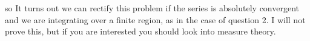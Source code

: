 \documentclass{article}
\begin{document}
so 
It turns out we can rectify this problem if the series is absolutely convergent and we are integrating over a finite region, as in the case of question 2. I will not prove this, but if you are interested you should look into measure theory. 
\begin{comment}
\subsection{Swapping sums and integrals - an example}
Let me define a function $a$ by 
\eq{
a(t) = \left\lbrace \begin{array}{cc}
\sin(\pi t) & 0 \leq t \leq 1 \\
0 & \text{otherwise}
\end{array} \right.
}
$a(t)$ looks like half a single period of a sin function in the interval $[0,1]$. Now let me define $a_n(t)$ by 
\eq{
a_n(t) = b_n a(t-n) - b_{n+1} a(t-n-1)
}
where $b_n$ is some other real sequence. The $a_n$ for $b_n = \frac{1}{n}$ are displayed below. 

\begin{center}
	\begin{tikzpicture}
	\begin{axis}[
	axis lines = center,
	xlabel = $t$,
	xmin = 0,
	extra y ticks = {0},
	set layers,
	axis on top,
	]
	
	
	\addplot [
	domain=1:2, 
	samples=100, 
	color=red,
	]
	{sin(deg(pi*(x-1)))};
	\addlegendentry{$a_1(t)$}
	
		\addplot [
	domain=2:3, 
	samples=100, 
	color=red,
	forget plot,
	]
	{-sin(deg(pi*(x-2)))/2};
	
		
	\addplot [
	domain=2:3, 
	samples=100, 
	color=blue,
	]
	{sin(deg(pi*(x-2)))/2};
	\addlegendentry{$a_2(t)$}
	
	\addplot [
	domain=3:4, 
	samples=100, 
	color=blue,
	forget plot,
	]
	{-sin(deg(pi*(x-3)))/3};
	
		\addplot [
	domain=3:4, 
	samples=100, 
	color=green,
	]
	{sin(deg(pi*(x-3)))/3};
	\addlegendentry{$a_3(t)$}
	
	\addplot [
	domain=4:5, 
	samples=100, 
	color=green,
	forget plot,
	]
	{-sin(deg(pi*(x-4)))/4};
	
	\end{axis}
	\end{tikzpicture}
\end{center}

We can now define functions $g_N$ by 
\eq{
g_N(t) = \sum_{n=1}^{N-1} a_n(t) = b_1 a(t-1) -b_N a(t-N)
}
\end{comment}
\end{document}
